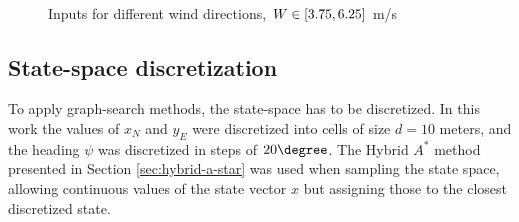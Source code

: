 \begin{figure}
    \centering
    \\
    \caption{Inputs for different wind directions, $W\in[3.75, 6.25]$ m/s}
    \label{fig:motion_prims}
\end{figure}

\subsection{State-space discretization}
To apply graph-search methods, the state-space has to be discretized. In this work the values of $x_N$ and $y_E$ were discretized into cells of size $d=10$ meters, and the 
heading $\psi$ was discretized in steps of $20\degree$. The Hybrid $A^*$ method presented in Section \ref{sec:hybrid-a-star} was used when sampling the state space, allowing continuous values of the state vector $x$ but assigning those to the closest 
discretized state.

